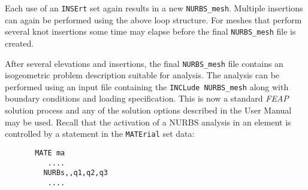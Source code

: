 Each use of an \texttt{INSErt} set again
results in a new \texttt{NURBS\_mesh}.  Multiple insertions can again be 
performed using the above loop structure.  For meshes that perform several
knot insertions some time may elapse before the final \texttt{NURBS\_mesh}
file is created.

After several elevations and insertions, the final \texttt{NURBS\_mesh} file
contains an isogeometric problem description suitable for analysis.  The
analysis can be performed using an input file containing the
\texttt{INCLude NURBS\_mesh} along with boundary conditions and loading
specification.  This is now a standard \textsl{FEAP} solution process and
any of the solution options described in the User Manual may be used.
Recall that the activation of a NURBS analysis in an element is controlled by a
statement in the \texttt{MATErial} set data:
\begin{verbatim}
       MATE ma
          ....
         NURBs,,q1,q2,q3
          ....
\end{verbatim}
